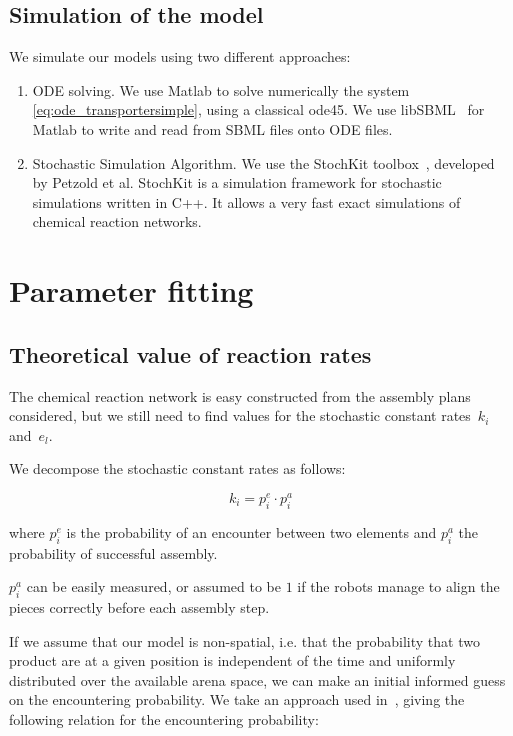 	\subsection{Simulation of the model} %
	\label{sub:simulation_of_the_model}
		We simulate our models using two different approaches:
		\begin{enumerate}
			\item ODE solving. We use Matlab to solve numerically the system \eqref{eq:ode_transportersimple}, using a classical ode45. We use libSBML~\cite{Bornstein:2008p7529} for Matlab to write and read from SBML files onto ODE files.
			\item Stochastic Simulation Algorithm. We use the StochKit toolbox~\cite{Li:2008p11431}, developed by Petzold et al. StochKit is a simulation framework for stochastic simulations written in C++. It allows a very fast exact simulations of chemical reaction networks.
		\end{enumerate}
	
\section{Parameter fitting} %
\label{sec:parameter_fitting}
	
	\subsection{Theoretical value of reaction rates} %
	\label{sub:theoretical_value_of_reaction_rates}
	
		The chemical reaction network is easy constructed from the assembly plans considered, but we still need to find values for the stochastic constant rates~$k_i$ and~$e_l$.
	
		We decompose the stochastic constant rates as follows:
	
		\begin{equation}\label{eq:reaction_assembly_rate}
			k_i = p^e_i \cdot p^a_i
		\end{equation}
	
		where $p^e_i$ is the probability of an encounter between two elements and $p_i^a$ the probability of successful assembly.
	
		$p_i^a$ can be easily measured, or assumed to be $1$ if the robots manage to align the pieces correctly before each assembly step.
	
		If we assume that our model is non-spatial, i.e. that the probability that two product are at a given position is independent of the time and uniformly distributed over the available arena space, we can make an initial informed guess on the encountering probability. We take an approach used in~\cite{Correll:2007p8184, Correll:2007p8236, Correll:2006p8328}, giving the following relation for the encountering probability:
	
